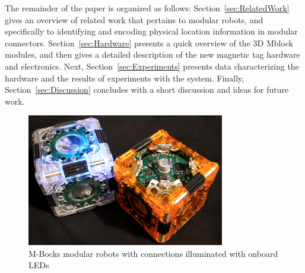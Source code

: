 



The remainder of the paper is organized as follows:
Section~\ref{sec:RelatedWork} gives an overview of related
work that pertains to modular robots, and specifically to identifying and encoding physical location information in modular connectors.
Section~\ref{sec:Hardware} presents a quick overview of the 3D Mblock modules, and then gives a detailed description of the new magnetic tag hardware and electronics.
Next, Section~\ref{sec:Experiments}
presents data characterizing the hardware and the results of
experiments with the system.
Finally, Section~\ref{sec:Discussion}
concludes with a short discussion and ideas for future work.

\begin{figure}[htb]

  \centering
  \includegraphics[width=3.4in]{Figures/cover.png}

  \caption{M-Bocks modular robots with connections illuminated with onboard LEDs}

  \label{fig:cover}
\end{figure}
